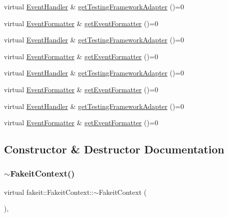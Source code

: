 \begin{DoxyCompactItemize}
\item 
virtual \mbox{\hyperlink{structfakeit_1_1EventHandler}{Event\+Handler}} \& \mbox{\hyperlink{structfakeit_1_1FakeitContext_a4be017ccd6c80cdafc02bd1985f183c8}{get\+Testing\+Framework\+Adapter}} ()=0
\item 
virtual \mbox{\hyperlink{structfakeit_1_1EventFormatter}{Event\+Formatter}} \& \mbox{\hyperlink{structfakeit_1_1FakeitContext_a066d191292b1002025b02f6569f48b9b}{get\+Event\+Formatter}} ()=0
\item 
virtual \mbox{\hyperlink{structfakeit_1_1EventHandler}{Event\+Handler}} \& \mbox{\hyperlink{structfakeit_1_1FakeitContext_a4be017ccd6c80cdafc02bd1985f183c8}{get\+Testing\+Framework\+Adapter}} ()=0
\item 
virtual \mbox{\hyperlink{structfakeit_1_1EventFormatter}{Event\+Formatter}} \& \mbox{\hyperlink{structfakeit_1_1FakeitContext_a066d191292b1002025b02f6569f48b9b}{get\+Event\+Formatter}} ()=0
\item 
virtual \mbox{\hyperlink{structfakeit_1_1EventHandler}{Event\+Handler}} \& \mbox{\hyperlink{structfakeit_1_1FakeitContext_a4be017ccd6c80cdafc02bd1985f183c8}{get\+Testing\+Framework\+Adapter}} ()=0
\item 
virtual \mbox{\hyperlink{structfakeit_1_1EventFormatter}{Event\+Formatter}} \& \mbox{\hyperlink{structfakeit_1_1FakeitContext_a066d191292b1002025b02f6569f48b9b}{get\+Event\+Formatter}} ()=0
\item 
virtual \mbox{\hyperlink{structfakeit_1_1EventHandler}{Event\+Handler}} \& \mbox{\hyperlink{structfakeit_1_1FakeitContext_a4be017ccd6c80cdafc02bd1985f183c8}{get\+Testing\+Framework\+Adapter}} ()=0
\item 
virtual \mbox{\hyperlink{structfakeit_1_1EventFormatter}{Event\+Formatter}} \& \mbox{\hyperlink{structfakeit_1_1FakeitContext_a066d191292b1002025b02f6569f48b9b}{get\+Event\+Formatter}} ()=0
\end{DoxyCompactItemize}


\subsection{Constructor \& Destructor Documentation}
\mbox{\label{structfakeit_1_1FakeitContext_adfad726870dfba97246a9ddfddd3a3d5}} 
\subsubsection{\texorpdfstring{$\sim$FakeitContext()}{~FakeitContext()}\hspace{0.1cm}{\footnotesize\ttfamily [1/9]}}
{\footnotesize\ttfamily virtual fakeit\+::\+Fakeit\+Context\+::$\sim$\+Fakeit\+Context (\begin{DoxyParamCaption}{ }\end{DoxyParamCaption})\hspace{0.3cm}{\ttfamily [virtual]}, {\ttfamily [default]}}

